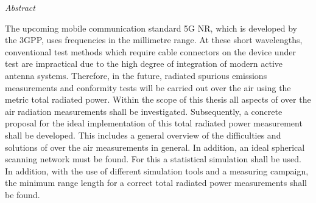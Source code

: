 

\newpage
\thispagestyle{empty}
\begin{center}
\Huge\emph{Abstract}
\end{center}
\medskip
\noindent

The upcoming mobile communication standard 5G NR, which is developed by the 3GPP, uses frequencies in the millimetre range. At these short wavelengths, conventional test methods which require cable connectors on the device under test are impractical due to the high degree of integration of modern active antenna systems. Therefore, in the future, radiated spurious emissions measurements and conformity tests will be carried out over the air using the metric total radiated power. Within the scope of this thesis all aspects of over the air radiation measurements shall be investigated. Subsequently, a concrete proposal for the ideal implementation of this total radiated power measurement shall be developed. This includes a general overview of the difficulties and solutions of over the air measurements in general. In addition, an ideal spherical scanning network must be found. For this a statistical simulation shall be used. In addition, with the use of different simulation tools and a measuring campaign, the minimum range length for a correct total radiated power measurements shall be found.
